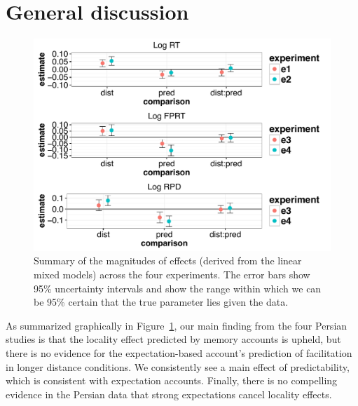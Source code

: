 \documentclass{frontiersSCNS}\usepackage{knitr} %
\begin{document}
\section{General discussion}

\begin{figure}[!htbp]
\begin{center}
\begin{knitrout}
\color{fgcolor}

{\centering \includegraphics[width=\maxwidth]{Figures/SafaviEtAlfiguresummarizeresults-1} 

}



\end{knitrout}
\caption{Summary of the magnitudes of effects (derived from the linear mixed models) across the four experiments. The error bars show 95\% uncertainty intervals and show the range within which we can be 95\% certain that the true parameter lies given the data.}\label{fig:all}
\end{center}
\end{figure}

As summarized graphically in Figure~\ref{fig:all}, 
our main finding from the four Persian studies is that the locality effect predicted by memory accounts is upheld, but there is no evidence for the expectation-based account's prediction of facilitation in longer distance conditions. 
We consistently see a main effect of predictability, which is consistent with expectation accounts.
Finally, there is no compelling evidence in the Persian data that strong expectations cancel locality effects.
\end{document}
